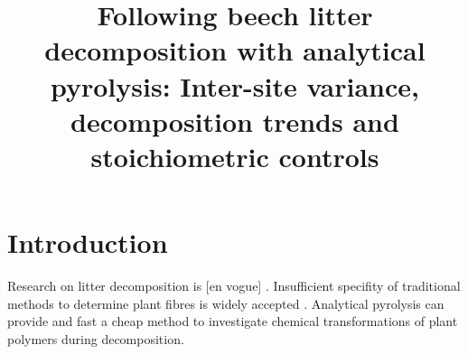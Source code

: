 \documentclass[preprint,review,12pt]{elsarticle}
\begin{document}
\begin{frontmatter}



\title{Following beech litter decomposition with analytical pyrolysis: Inter-site variance, decomposition trends and stoichiometric controls}


\author{}

\address{}

\begin{abstract}

\end{abstract}

\begin{keyword}


\end{keyword}

\end{frontmatter}
\pagestyle{empty}



\section{Introduction}

Research on litter decomposition is [en vogue] \cite{Prescott2010}. Insufficient specifity of traditional methods to determine plant fibres is widely accepted \cite{Hatfield2005}. Analytical pyrolysis can provide and fast a cheap method to investigate chemical transformations of plant polymers during decomposition. 
\end{document}
